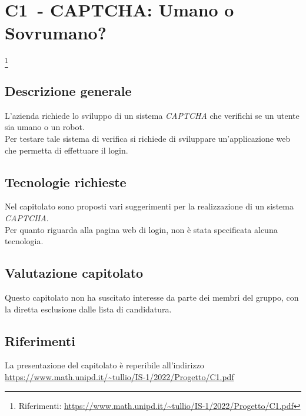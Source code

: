 
\renewcommand{\capName}{CAPTCHA: Umano o Sovrumano?} %
\renewcommand{\capCode}{C1} %
\renewcommand{\capLink}{https://www.math.unipd.it/~tullio/IS-1/2022/Progetto/C1.pdf} %
\renewcommand{\capProposer}{Zucchetti} %


\section{\capCode\ - \capName} \footnote{Riferimenti: \url{\capLink}}
\subsection{Descrizione generale}
L'azienda richiede lo sviluppo di un sistema \emph{CAPTCHA} che verifichi se un utente sia umano o un robot. \\
Per testare tale sistema di verifica si richiede di sviluppare un'applicazione web che permetta di effettuare il login. 

\subsection{Tecnologie richieste}
Nel capitolato sono proposti vari suggerimenti per la realizzazione di un sistema \emph{CAPTCHA}. \\
Per quanto riguarda alla pagina web di login, non è stata specificata alcuna tecnologia.

\subsection{Valutazione capitolato}
Questo capitolato non ha suscitato interesse da parte dei membri del gruppo, con la diretta esclusione dalle lista di candidatura.

\subsection{Riferimenti}
La presentazione del capitolato è reperibile all'indirizzo \url{\capLink}